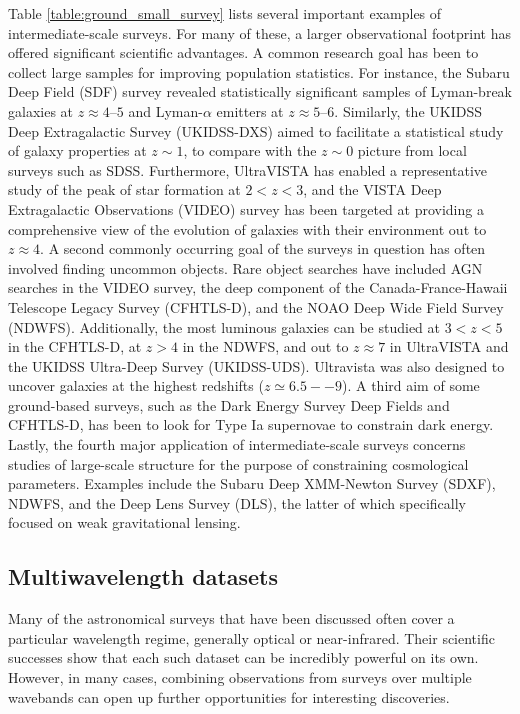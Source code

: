 Table \ref{table:ground_small_survey} lists several important examples of intermediate-scale surveys. For many of these, a larger observational footprint has offered significant scientific advantages. A common research goal has been to collect large samples for improving population statistics. For instance, the Subaru Deep Field (SDF) survey revealed statistically significant samples of Lyman-break galaxies at $z \approx \numrange{4}{5}$ and Lyman-$\alpha$ emitters at $z \approx \numrange{5}{6} $. Similarly, the UKIDSS Deep Extragalactic Survey (UKIDSS-DXS) aimed to facilitate a statistical study of galaxy properties at $z\sim 1$, to compare with the $z\sim 0$ picture from local surveys such as SDSS. Furthermore, UltraVISTA has enabled a representative study of the peak of star formation at $2<z<3$, and the VISTA Deep Extragalactic Observations (VIDEO) survey has been targeted at providing a comprehensive view of the evolution of galaxies with their environment out to $z\approx4$. A second commonly occurring goal of the surveys in question has often involved finding uncommon objects. Rare object searches have included AGN searches in the VIDEO survey, the deep component of the Canada-France-Hawaii Telescope Legacy Survey (CFHTLS-D), and the NOAO Deep Wide Field Survey (NDWFS). Additionally, the most luminous galaxies can be studied at $3<z<5$ in the CFHTLS-D, at $z>4$ in the NDWFS, and out to $z\approx7$ in UltraVISTA and the UKIDSS Ultra-Deep Survey (UKIDSS-UDS). Ultravista was also designed to uncover galaxies at the highest redshifts ($ z \simeq 6.5--9$). A third aim of some ground-based surveys, such as the Dark Energy Survey Deep Fields and CFHTLS-D, has been to look for Type Ia supernovae to constrain dark energy. Lastly, the fourth major application of intermediate-scale surveys concerns studies of large-scale structure for the purpose of constraining cosmological parameters. Examples include the Subaru Deep XMM-Newton Survey (SDXF), NDWFS, and the Deep Lens Survey (DLS), the latter of which specifically focused on weak gravitational lensing. \par 



\subsection{Multiwavelength datasets}\label{subsection:multiwavelength}
Many of the astronomical surveys that have been discussed often cover a particular wavelength regime, generally  optical or near-infrared. Their scientific successes show that each such dataset can be incredibly powerful on its own. However, in many cases, combining observations from surveys over multiple wavebands can open up further opportunities for interesting discoveries. \par 


